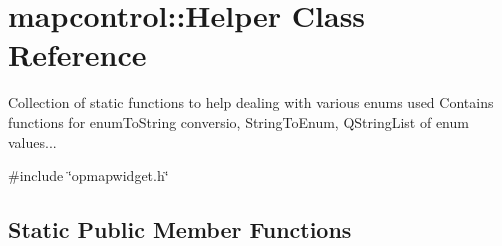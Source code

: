 \hypertarget{classmapcontrol_1_1_helper}{\section{mapcontrol\-:\-:Helper Class Reference}
\label{classmapcontrol_1_1_helper}
}


Collection of static functions to help dealing with various enums used Contains functions for enum\-To\-String conversio, String\-To\-Enum, Q\-String\-List of enum values...  




{\ttfamily \#include \char`\"{}opmapwidget.\-h\char`\"{}}

\subsection*{Static Public Member Functions}
